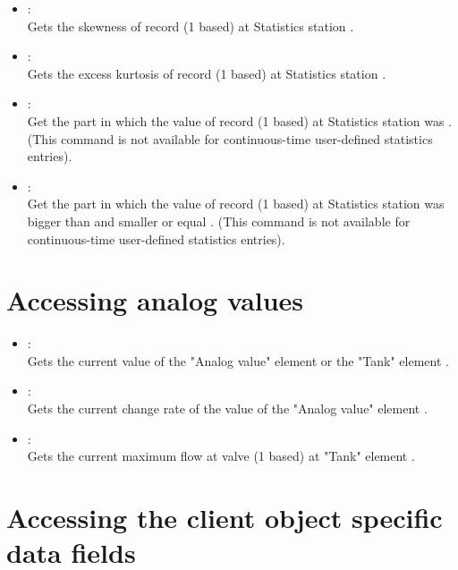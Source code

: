 \begin{itemize}
\item
{}:\\
Gets the skewness of record  (1 based) at Statistics station .

\item
{}:\\
Gets the excess kurtosis of record  (1 based) at Statistics station .

\item
{}:\\
Get the part in which the value of record  (1 based) at Statistics station  was .
(This command is not available for continuous-time user-defined statistics entries).

\item
{}:\\
Get the part in which the value of record  (1 based) at Statistics station  was bigger than  and smaller or equal .
(This command is not available for continuous-time user-defined statistics entries).

\end{itemize}



\section{Accessing analog values}
  
\begin{itemize}

\item
{}:\\
Gets the current value of the "Analog value" element or the "Tank" element .

\item
{}:\\
Gets the current change rate of the value of the "Analog value" element .

\item
{}:\\
Gets the current maximum flow at valve  (1 based) at "Tank" element .

\end{itemize}



\section{Accessing the client object specific data fields}

